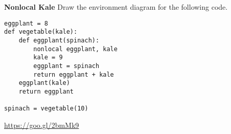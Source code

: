\begin{blocksection}
\question \textbf{Nonlocal Kale} \newline
Draw the environment diagram for the following code.

\begin{lstlisting}
eggplant = 8
def vegetable(kale):
    def eggplant(spinach):
        nonlocal eggplant, kale
        kale = 9
        eggplant = spinach
        return eggplant + kale
    eggplant(kale)
    return eggplant

spinach = vegetable(10)
\end{lstlisting}

\begin{solution}[1.5in]
\url{https://goo.gl/2bmMk9}
\end{solution}
\end{blocksection}
